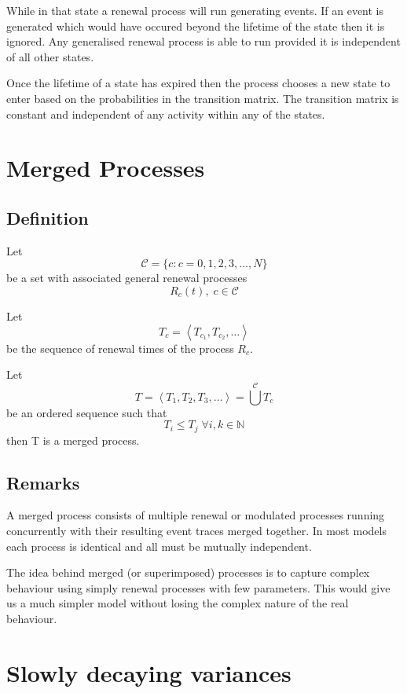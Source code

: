 While in that state a renewal process will run generating events.  If
an event is generated which would have occured beyond the lifetime of
the state then it is ignored.  Any generalised renewal process is able
to run provided it is independent of all other states.

Once the lifetime of a state has expired then the process chooses a new
state to enter based on the probabilities in the transition matrix.
The transition matrix is constant and independent of any activity
within any of the states.

\section{Merged Processes}
\label{models:mergedprocs}

\subsection{Definition}

Let
\[ {\mathcal C} = \{c:c = 0,1,2,3,\ldots, N\} \]
be a set with associated general renewal processes
\[R_c(t), \; c \in {\mathcal C} \]

Let
\[ T_c = \left< T_{c_1}, T_{c_2}, \ldots \right> \]
 be the sequence of renewal times of the process $R_c$.

Let 
\[ T = \left<T_1, T_2, T_3, \ldots \right> = \bigcup^{\mathcal C}T_c \]
 be an ordered sequence such that 
\[ T_i \leq T_j \; \forall i,k \in {\mathbb N} \]
then T is a merged process.

\subsection{Remarks}

A merged process consists of multiple renewal or modulated processes
running concurrently with their resulting event traces merged
together.  In most models each process is identical and all must be
mutually independent.

The idea behind merged (or superimposed) processes is to capture
complex behaviour using simply renewal processes with few parameters.
This would give us a much simpler model without losing the complex
nature of the real behaviour.

\section{Slowly decaying variances}


